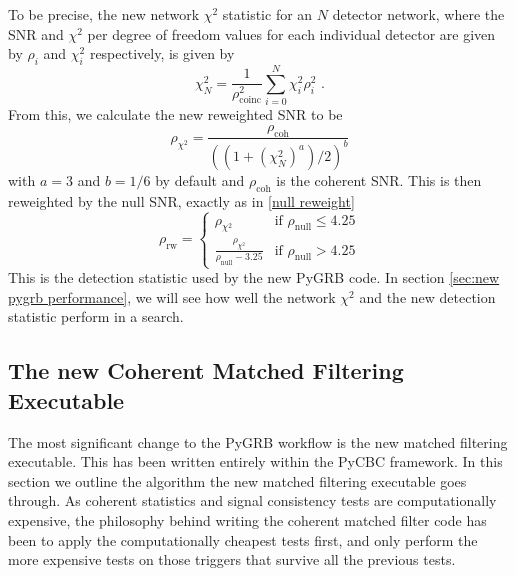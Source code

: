 \documentclass[11pt]{cuthesis}
\newcommand{\fs}{\text{ .}}
\begin{document}
To be precise, the new network $\chi^2$ statistic for an $N$ detector network, where the SNR and $\chi^2$ per degree of freedom values for each individual detector are given by $\rho_i$ and $\chi^2_i$ respectively, is given by
\begin{equation}
\chi^2_N = \frac{ 1 }{\rho_\text{coinc}^2} \sum_{i=0}^N \chi^2_i \rho^2_i \fs
\end{equation}
From this, we calculate the new reweighted SNR to be
\begin{equation}
\rho_{\chi^2} = \frac{\rho_\text{coh}}{((1+(\chi^2_N)^a)/2)^b}
\end{equation}
with $a=3$ and $b=1/6$ by default and $\rho_\text{coh}$ is the coherent SNR. This is then reweighted by the null SNR, exactly as in \ref{null reweight}
\begin{equation} \label{null reweight2}
\rho_\text{rw} = \begin{cases} \rho_{\chi^2} & \mbox{if } \rho_\text{null} \leq 4.25 \\ \frac{\rho_{\chi^2}}{ \rho_\text{null} -3.25} & \mbox{if } \rho_\text{null} > 4.25\end{cases}
\end{equation}
This is the detection statistic used by the new PyGRB code. In section \ref{sec:new pygrb performance}, we will see how well the network $\chi^2$ and the new detection statistic perform in a search.

\subsection{The new Coherent Matched Filtering Executable}
The most significant change to the PyGRB workflow is the new matched filtering executable. This has been written entirely within the PyCBC framework. In this section we outline the algorithm the new matched filtering executable goes through. As coherent statistics and signal consistency tests are computationally expensive, the philosophy behind writing the coherent matched filter code has been to apply the computationally cheapest tests first, and only perform the more expensive tests on those triggers that survive all the previous tests.
\end{document}
